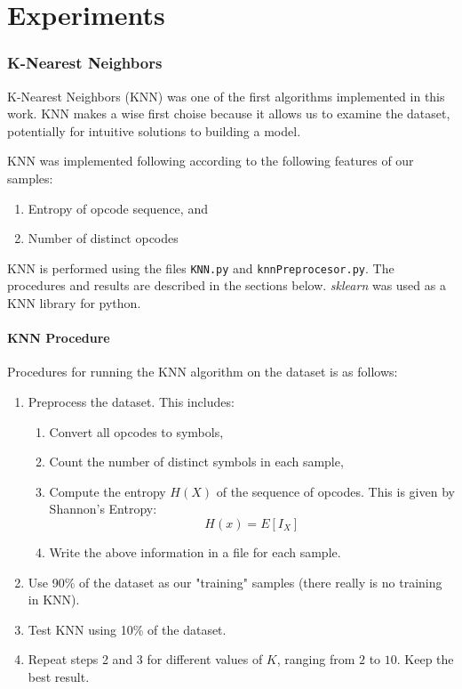 \documentclass[12pt]{article}
\begin{document}
\part{Experiments}
\section{K-Nearest Neighbors}
K-Nearest Neighbors (KNN) was one of the first algorithms implemented in this work. KNN makes a wise first choise because it allows us to examine the dataset, potentially for intuitive solutions to building a model.

KNN was implemented following according to the following features of our samples:
  \begin{enumerate}
    \item Entropy of opcode sequence, and
    \item Number of distinct opcodes
  \end{enumerate}
  KNN is performed using the files \texttt{KNN.py} and \texttt{knnPreprocesor.py}. The procedures and results are described in the sections below. \textit{sklearn} was used as a KNN library for python.

\subsection{KNN Procedure}
  Procedures for running the KNN algorithm on the dataset is as follows:

  \begin{enumerate}
    \item Preprocess the dataset. This includes:
        \begin{enumerate}
          \item Convert all opcodes to symbols,
          \item Count the number of distinct symbols in each sample,
          \item Compute the entropy $H(X)$ of the sequence of opcodes. This is given by Shannon's Entropy:
          \begin{equation}
            H(x) = E[I_X] 
          \end{equation}
        \item Write the above information in a file for each sample.
        \end{enumerate}
      \item Use 90\% of the dataset as our "training" samples (there really is no training in KNN).
      \item Test KNN using 10\% of the dataset.
      \item Repeat steps 2 and 3 for different values of $K$, ranging from $2$ to $10$. Keep the best result.
  \end{enumerate}
\end{document}
